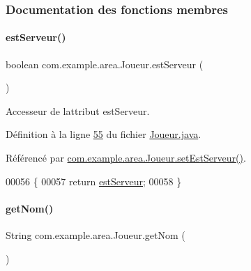 \subsubsection{Documentation des fonctions membres}
\mbox{\label{classcom_1_1example_1_1area_1_1_joueur_ad35bff2a14331bada30ccc164d25f50f}} 
\paragraph{\texorpdfstring{est\+Serveur()}{estServeur()}}
{\footnotesize\ttfamily boolean com.\+example.\+area.\+Joueur.\+est\+Serveur (\begin{DoxyParamCaption}{ }\end{DoxyParamCaption})}



Accesseur de l\textquotesingle{}attribut est\+Serveur. 



Définition à la ligne \hyperlink{_joueur_8java_source_l00055}{55} du fichier \hyperlink{_joueur_8java_source}{Joueur.\+java}.



Référencé par \hyperlink{_joueur_8java_source_l00063}{com.\+example.\+area.\+Joueur.\+set\+Est\+Serveur()}.


\begin{DoxyCode}
00056       \{
00057           \textcolor{keywordflow}{return} \hyperlink{classcom_1_1example_1_1area_1_1_joueur_ad35bff2a14331bada30ccc164d25f50f}{estServeur};
00058       \}
\end{DoxyCode}
\mbox{\label{classcom_1_1example_1_1area_1_1_joueur_a4e43a9187363501204af7b2f2c84a9a4}} 
\paragraph{\texorpdfstring{get\+Nom()}{getNom()}}
{\footnotesize\ttfamily String com.\+example.\+area.\+Joueur.\+get\+Nom (\begin{DoxyParamCaption}{ }\end{DoxyParamCaption})}



